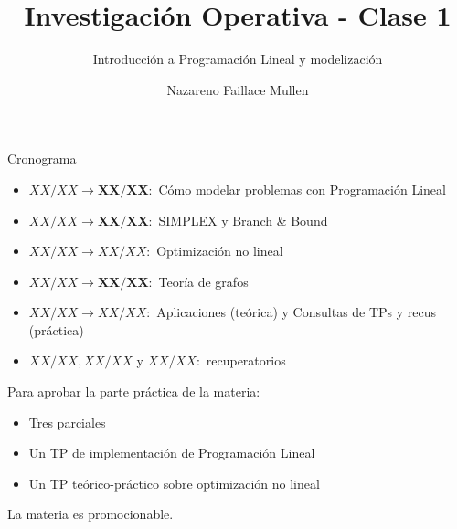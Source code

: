 \documentclass[10pt, aspectratio=169]{beamer}
\title{Investigación Operativa - Clase 1}
\subtitle{Introducción a Programación Lineal y modelización}
\date{\cuatri}
\author{Nazareno Faillace Mullen}
\institute{Departamento de Matemática - FCEN - UBA}
\begin{document}
\maketitle



\begin{frame}{Cronograma}
    \begin{itemize}
        \item $XX/XX \rightarrow \mathbf{XX/XX}\colon$ Cómo modelar problemas con Programación Lineal
        \item $XX/XX \rightarrow \mathbf{XX/XX}\colon$ SIMPLEX y Branch \& Bound
        \item $XX/XX \rightarrow XX/XX\colon$ Optimización no lineal
        \item $XX/XX \rightarrow \mathbf{XX/XX}\colon$ Teoría de grafos
        \item $XX/XX \rightarrow XX/XX\colon$ Aplicaciones (teórica) y Consultas de TPs y recus (práctica)
        \item $XX/XX, XX/XX$ y $XX/XX\colon$ recuperatorios
    \end{itemize}
    \vspace{1em}

    Para aprobar la parte práctica de la materia:
    \begin{itemize}
        \item Tres parciales
        \item Un TP de implementación de Programación Lineal
        \item Un TP teórico-práctico sobre optimización no lineal
    \end{itemize}
    La materia es \alert{promocionable}.
\end{frame}
\end{document}
